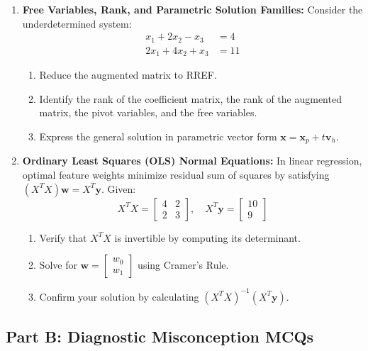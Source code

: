 \begin{enumerate}
    \item \textbf{Free Variables, Rank, and Parametric Solution Families:}
    Consider the underdetermined system:
    \begin{align*}
    x_1 + 2x_2 - x_3 &= 4 \\
    2x_1 + 4x_2 + x_3 &= 11
    \end{align*}
    \begin{enumerate}
        \item Reduce the augmented matrix to RREF.
        \item Identify the rank of the coefficient matrix, the rank of the augmented matrix, the pivot variables, and the free variables.
        \item Express the general solution in parametric vector form $\mathbf{x} = \mathbf{x}_p + t \mathbf{v}_h$.
    \end{enumerate}

    \item \textbf{Ordinary Least Squares (OLS) Normal Equations:}
    In linear regression, optimal feature weights minimize residual sum of squares by satisfying $(X^T X)\mathbf{w} = X^T \mathbf{y}$. Given:
    \begin{equation}
    X^T X = \begin{bmatrix} 4 & 2 \\ 2 & 3 \end{bmatrix}, \quad X^T \mathbf{y} = \begin{bmatrix} 10 \\ 9 \end{bmatrix}
    \end{equation}
    \begin{enumerate}
        \item Verify that $X^T X$ is invertible by computing its determinant.
        \item Solve for $\mathbf{w} = \begin{bmatrix} w_0 \\ w_1 \end{bmatrix}$ using Cramer's Rule.
        \item Confirm your solution by calculating $(X^T X)^{-1} (X^T \mathbf{y})$.
    \end{enumerate}
\end{enumerate}

\subsection*{Part B: Diagnostic Misconception MCQs}

